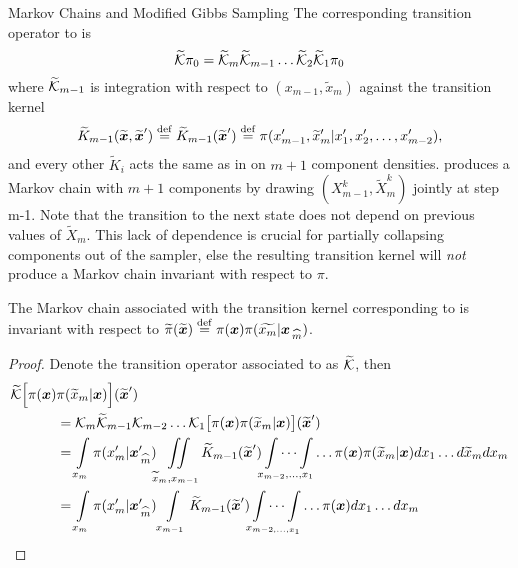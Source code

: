\begin{chapter}{Markov Chains and Modified Gibbs Sampling}
The corresponding transition operator to  is
\begin{equation}
  \widetilde {\mathcal K}\pi_0 = \widetilde {\mathcal K}_m \widetilde {\mathcal K}_{m-1}\dots \widetilde {\mathcal K}_2 \widetilde {\mathcal K}_1 \pi_0
\end{equation}
where $\widetilde{\mathcal K}_{m-1}$ is integration with respect to $(x_{m-1},\tilde x_m)$ against the transition kernel
\begin{equation}
  \widetilde K_{m-1}(\widetilde{\mbox{\boldmath$x$}},\widetilde{\mbox{\boldmath$x$}}') \stackrel{\rm def}{=} \widetilde K_{m-1}(\widetilde{\mbox{\boldmath$x$}}') \stackrel{\rm def}{=} \pi(x_{m-1}',\widetilde x_m'|x_1',x_2',\dots,x_{m-2}'),
\end{equation}
and every other $\tilde K_i$ acts the same as in  on $m+1$ component densities.
 produces a Markov chain with $m+1$ components by drawing $(X_{m-1}^k,\tilde X_m^k)$ jointly at step m-1. 
Note that the transition to the next state does not depend on previous values of $\tilde X_m$.
This lack of dependence is crucial for partially collapsing components out of the sampler, else the resulting transition kernel will \emph{not} produce a Markov chain invariant with respect to $\pi$.
\begin{prop}\label{thm:conditionedGibbsStationary}
  The Markov chain associated with the transition kernel corresponding to  is invariant with respect to $\widetilde\pi(\widetilde{\mbox{\boldmath$x$}}) \stackrel{\rm def}{=} \pi(\mbox{\boldmath$x$})\pi(\widetilde{x_m}|\mbox{\boldmath$x$}_{\,\widehat{m}})$.
\end{prop}
\begin{proof}
  Denote the transition operator associated to  as $\widetilde {\mathcal K}$, then
  \begin{align}
    \tilde\K\Big[ \pi(\vect x)&\pi(\tilde x_m|\vect x)\Big](\tilde{\vect x}') \nonumber \\ 
    &= \K_m \tilde\K_{m-1} \K_{m-2}\dots\K_{1} \big[\pi(\vect x)\pi(\tilde x_m|\vect x)\big](\tilde{\vect x}') \nonumber\\
    &= \int\limits_{x_m} \pi(x_m'|\rem xm')\iint\limits_{\tilde x_m,x_{m-1}}\tilde K_{m-1}(\tilde{\vect x}')\idotsint\limits_{x_{m-2},\dots,x_1}\dots \pi(\vect x)\pi(\tilde x_m|\vect x)dx_1\dots d\tilde x_m dx_m \nonumber\\
    &= \int\limits_{x_m} \pi(x_m'|\rem xm')\int\limits_{x_{m-1}}\tilde K_{m-1}(\tilde{\vect x}')\idotsint\limits_{x_{m-2,\dots,x_1}}\dots \pi(\vect x)dx_1\dots dx_m \label{eq:conditionedGibbsCalc}

\end{align}
\end{proof}
\end{chapter}
